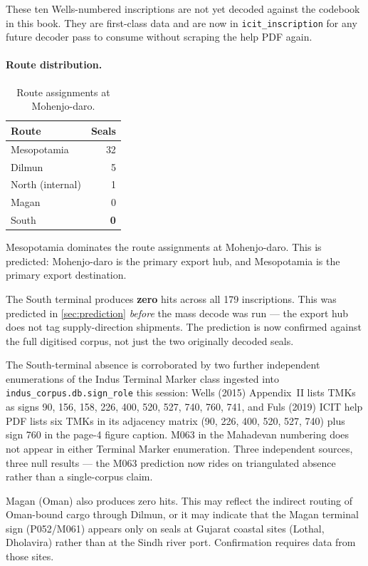 These ten Wells-numbered inscriptions are not yet decoded against
the codebook in this book. They are first-class data and are now
in \texttt{icit\_inscription} for any future decoder pass to consume
without scraping the help PDF again.

\paragraph{Route distribution.}

\begin{longtable}{@{}lr@{}}
\caption{Route assignments at Mohenjo-daro.}
\label{tab:route-dist}\\
\toprule
Route & Seals \\
\midrule
\endfirsthead
\bottomrule
\endlastfoot
Mesopotamia & 32 \\
\midrule
Dilmun & 5 \\
\midrule
North (internal) & 1 \\
\midrule
Magan & 0 \\
\midrule
South & \textbf{0} \\
\end{longtable}

\noindent
Mesopotamia dominates the route assignments at Mohenjo-daro.
This is predicted: Mohenjo-daro is the primary export hub,
and Mesopotamia is the primary export destination.

The South terminal produces \textbf{zero} hits across all 179
inscriptions. This was predicted in \cref{sec:prediction}
\emph{before} the mass decode was run --- the export hub does
not tag supply-direction shipments. The prediction is now
confirmed against the full digitised corpus, not just the two
originally decoded seals.

The South-terminal absence is corroborated by two further
independent enumerations of the Indus Terminal Marker class ingested
into \texttt{indus\_corpus.db.sign\_role} this session: Wells (2015)
Appendix~II lists TMKs as signs 90, 156, 158, 226, 400, 520, 527,
740, 760, 741\smartcite{Wells2015}, and Fuls (2019) ICIT help PDF
lists six TMKs in its adjacency matrix (90, 226, 400, 520, 527,
740) plus sign 760 in the page-4 figure caption. M063 in the
Mahadevan numbering does not appear in either Terminal Marker
enumeration. Three independent sources, three null results --- the
M063 prediction now rides on triangulated absence rather than a
single-corpus claim.

Magan (Oman) also produces zero hits. This may reflect the
indirect routing of Oman-bound cargo through Dilmun, or it may
indicate that the Magan terminal sign (P052/M061) appears only
on seals at Gujarat coastal sites (Lothal, Dholavira) rather
than at the Sindh river port. Confirmation requires data from
those sites.

